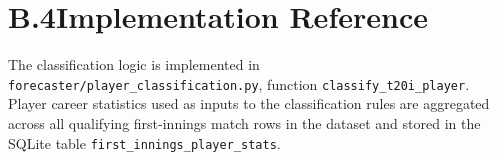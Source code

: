 \section*{B.4\quad Implementation Reference}

The classification logic is implemented in \texttt{forecaster/player\_classification.py}, function \texttt{classify\_t20i\_player}. Player career statistics used as inputs to the classification rules are aggregated across all qualifying first-innings match rows in the dataset and stored in the SQLite table \texttt{first\_innings\_player\_stats}.
